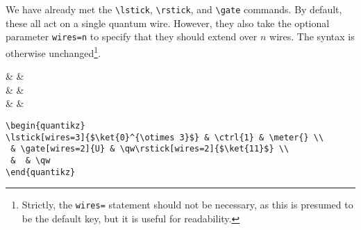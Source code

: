 \documentclass[aps,pra,10pt,nofootinbib]{revtex4}
\begin{document}
We have already met the \verb!\lstick!, \verb!\rstick!, and \verb!\gate! commands. By default, these all act on a single quantum wire. However, they also take the optional parameter \verb!wires=n! to specify that they should extend over $n$ wires. The syntax is otherwise unchanged\footnote{Strictly, the \texttt{wires=} statement should not be necessary, as this is presumed to be the default key, but it is useful for readability.}.

\begin{Code}
\begin{center}
\begin{quantikz}
 &  & \meter{} \\
 &  & \qw{} \\
 &  & \qw
\end{quantikz}
\end{center}
\tcblower
\begin{lstlisting}
\begin{quantikz}
\lstick[wires=3]{$\ket{0}^{\otimes 3}$} & \ctrl{1} & \meter{} \\
 & \gate[wires=2]{U} & \qw\rstick[wires=2]{$\ket{11}$} \\
 &  & \qw
\end{quantikz}
\end{lstlisting}
\end{Code}
\end{document}
